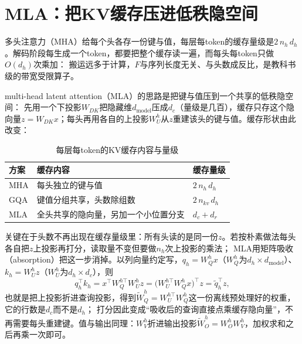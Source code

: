\documentclass[12pt,a4paper,fontset=fandol]{ctexbook}
\begin{document}
\section{MLA：把KV缓存压进低秩隐空间}

多头注意力（MHA）给每个头各存一份键与值，每层每token的缓存量级是$2\,n_h\,d_h$。解码阶段每生成一个token，都要把整个缓存读一遍，而每头每token只做$O(d_h)$次乘加：
搬运远多于计算，$F$与序列长度无关、与头数成反比，是教科书级的带宽受限算子。

multi-head latent attention（MLA）的思路是把键与值压到一个共享的低秩隐空间：
先用一个下投影$W_{DK}$把隐藏维$d_{\text{model}}$压成$d_c$（量级是几百），缓存只存这个隐向量$z=W_{DK}x$；每头再用各自的上投影$W_U^h$从$z$重建该头的键与值。缓存形状由此改变：

\begin{table}[H]
\centering
\caption{每层每token的KV缓存内容与量级}
\begin{tabular}{@{}>{\raggedright\arraybackslash}p{}
  >{\raggedright\arraybackslash}p{}
  >{\raggedright\arraybackslash}p{}@{}}
\toprule
方案&缓存内容&缓存量级\\
\midrule
MHA &每头独立的键与值& $2\,n_h\,d_h$ \\
GQA &键值分组共享，头数除组数& $2\,n_{kv}\,d_h$ \\
MLA &全头共享的隐向量，另加一个小位置分支& $d_c+d_r$ \\
\bottomrule
\end{tabular}
\end{table}

关键在于头数不再出现在缓存量级里：所有头读的是同一份$z$。若按朴素做法每头各自把$z$上投影再打分，读取量不变但要做$n_h$次上投影的乘法；
MLA用矩阵吸收（absorption）把这一步消掉。以列向量约定写，$q_h=W_Q^hx$（$W_Q^h$为$d_h\times d_{\text{model}}$）、
$k_h=W_U^hz$（$W_U^h$为$d_h\times d_c$），则
\begin{equation}
q_h^{\top}k_h=x^{\top}W_Q^{h\top}W_U^{h}z
=\bigl(W_U^{h\top}W_Q^h x\bigr)^{\top}z=\tilde q_h^{\top}z,
\end{equation}
也就是把上投影折进查询投影，得到$\tilde W_Q^h=W_U^{h\top}W_Q^h$这一份离线预处理好的权重，它的行数是$d_c$而不是$d_h$；
打分因此变成``吸收后的查询直接点乘缓存隐向量''，不再需要每头重建键。值与输出同理：$W_V^h$折进输出投影$\tilde W_O^h=W_O^hW_V^h$，加权求和之后再乘一次即可。
\end{document}
